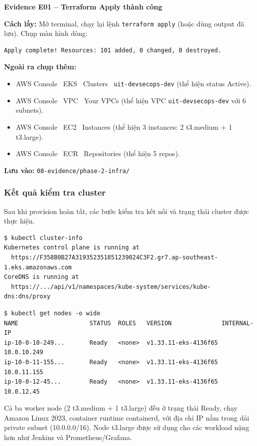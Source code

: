 \documentclass[13pt,a4paper,twoside]{extarticle}
\newcommand{\evidence}[1]{%
  \begin{evidencebox}
  #1
  \end{evidencebox}
}
\begin{document}
\evidence{
\textbf{Evidence E01 -- Terraform Apply thành công}

\smallskip
\textbf{Cách lấy:} Mở terminal, chạy lại lệnh \texttt{terraform apply} (hoặc dùng output đã lưu). Chụp màn hình dòng:
\begin{verbatim}
Apply complete! Resources: 101 added, 0 changed, 0 destroyed.
\end{verbatim}
\textbf{Ngoài ra chụp thêm:}
\begin{itemize}[leftmargin=*,nosep]
  \item AWS Console \textrightarrow\ EKS \textrightarrow\ Clusters \textrightarrow\ \texttt{uit-devsecops-dev} (thể hiện status Active).
  \item AWS Console \textrightarrow\ VPC \textrightarrow\ Your VPCs (thể hiện VPC \texttt{uit-devsecops-dev} với 6 subnets).
  \item AWS Console \textrightarrow\ EC2 \textrightarrow\ Instances (thể hiện 3 instances: 2 t3.medium + 1 t3.large).
  \item AWS Console \textrightarrow\ ECR \textrightarrow\ Repositories (thể hiện 5 repos).
\end{itemize}
\textbf{Lưu vào:} \texttt{08-evidence/phase-2-infra/}
}

\subsubsection{Kết quả kiểm tra cluster}

Sau khi provision hoàn tất, các bước kiểm tra kết nối và trạng thái cluster được thực hiện.

\begin{verbatim}
$ kubectl cluster-info
Kubernetes control plane is running at
  https://F358B0B27A319352351851239024C3F2.gr7.ap-southeast-1.eks.amazonaws.com
CoreDNS is running at
  https://.../api/v1/namespaces/kube-system/services/kube-dns:dns/proxy
\end{verbatim}

\begin{verbatim}
$ kubectl get nodes -o wide
NAME                    STATUS  ROLES   VERSION              INTERNAL-IP
ip-10-0-10-249...       Ready   <none>  v1.33.11-eks-4136f65 10.0.10.249
ip-10-0-11-155...       Ready   <none>  v1.33.11-eks-4136f65 10.0.11.155
ip-10-0-12-45...        Ready   <none>  v1.33.11-eks-4136f65 10.0.12.45
\end{verbatim}

Cả ba worker node (2 t3.medium + 1 t3.large) đều ở trạng thái Ready, chạy Amazon Linux 2023, container runtime containerd, với địa chỉ IP nằm trong dải private subnet (10.0.0.0/16). Node t3.large được sử dụng cho các workload nặng hơn như Jenkins và Prometheus/Grafana.
\end{document}
